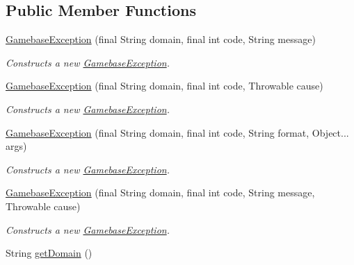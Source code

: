\subsection*{Public Member Functions}
\begin{DoxyCompactItemize}
\item 
\hyperlink{classcom_1_1toast_1_1android_1_1gamebase_1_1base_1_1_gamebase_exception_a2db07ce4db851d795e5d61f772c4e9c0}{Gamebase\+Exception} (final String domain, final int code, String message)
\begin{DoxyCompactList}\small\item\em Constructs a new \hyperlink{classcom_1_1toast_1_1android_1_1gamebase_1_1base_1_1_gamebase_exception}{Gamebase\+Exception}. \end{DoxyCompactList}\item 
\hyperlink{classcom_1_1toast_1_1android_1_1gamebase_1_1base_1_1_gamebase_exception_a209b0f96c3bc11a5bc4e9ab40ec9cfb9}{Gamebase\+Exception} (final String domain, final int code, Throwable cause)
\begin{DoxyCompactList}\small\item\em Constructs a new \hyperlink{classcom_1_1toast_1_1android_1_1gamebase_1_1base_1_1_gamebase_exception}{Gamebase\+Exception}. \end{DoxyCompactList}\item 
\hyperlink{classcom_1_1toast_1_1android_1_1gamebase_1_1base_1_1_gamebase_exception_a6c1aeab324f85236499d5e3d92fbc705}{Gamebase\+Exception} (final String domain, final int code, String format, Object... args)
\begin{DoxyCompactList}\small\item\em Constructs a new \hyperlink{classcom_1_1toast_1_1android_1_1gamebase_1_1base_1_1_gamebase_exception}{Gamebase\+Exception}. \end{DoxyCompactList}\item 
\hyperlink{classcom_1_1toast_1_1android_1_1gamebase_1_1base_1_1_gamebase_exception_a7b72e20ebb8e0469d8a5b3ba839b97fa}{Gamebase\+Exception} (final String domain, final int code, String message, Throwable cause)
\begin{DoxyCompactList}\small\item\em Constructs a new \hyperlink{classcom_1_1toast_1_1android_1_1gamebase_1_1base_1_1_gamebase_exception}{Gamebase\+Exception}. \end{DoxyCompactList}\item 
String \hyperlink{classcom_1_1toast_1_1android_1_1gamebase_1_1base_1_1_gamebase_exception_a8facb1769856d29a5998bb90146fa5ef}{get\+Domain} ()

\end{DoxyCompactItemize}
